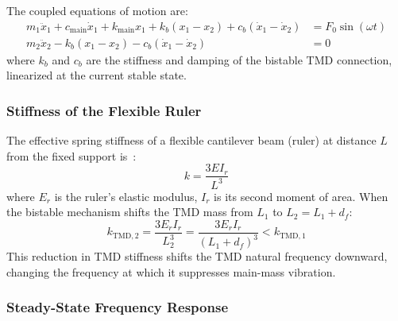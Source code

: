 \documentclass[11pt,letterpaper]{article}
\begin{document}
The coupled equations of motion are:
\begin{align}
  m_1\ddot{x}_1 + c_{\mathrm{main}}\dot{x}_1 + k_{\mathrm{main}}x_1
    + k_b(x_1 - x_2) + c_b(\dot{x}_1 - \dot{x}_2) &= F_0\sin(\omega t)
  \label{eq:2dof1}\\
  m_2\ddot{x}_2 - k_b(x_1 - x_2) - c_b(\dot{x}_1 - \dot{x}_2) &= 0
  \label{eq:2dof2}
\end{align}
where $k_b$ and $c_b$ are the stiffness and damping of the bistable TMD
connection, linearized at the current stable state.

\subsubsection{Stiffness of the Flexible Ruler}

The effective spring stiffness of a flexible cantilever beam (ruler) at
distance $L$ from the fixed support is~\cite{zolfagharian2025}:
\begin{equation}
  k = \frac{3EI_r}{L^3}
  \label{eq:rulerspring}
\end{equation}
where $E_r$ is the ruler's elastic modulus, $I_r$ is its second moment of area.
When the bistable mechanism shifts the TMD mass from $L_1$ to $L_2 = L_1 + d_f$:
\begin{equation}
  k_{\mathrm{TMD,2}} = \frac{3E_r I_r}{L_2^3}
                     = \frac{3E_r I_r}{(L_1 + d_f)^3}
                     < k_{\mathrm{TMD,1}}
  \label{eq:kTMDshift}
\end{equation}
This reduction in TMD stiffness shifts the TMD natural frequency downward,
changing the frequency at which it suppresses main-mass vibration.

\subsubsection{Steady-State Frequency Response}
\end{document}
